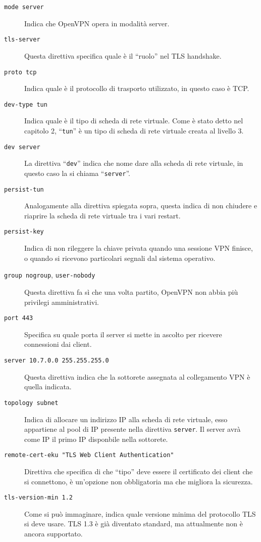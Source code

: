 \begin{description}
  \item[\texttt{mode server}]Indica che OpenVPN opera in modalità server.
  \item[\texttt{tls-server}]Questa direttiva specifica quale è il ``ruolo'' nel TLS
  handshake.
  \item[\texttt{proto tcp}]Indica quale è il protocollo di trasporto utilizzato,
  in questo caso è TCP.
  \item[\texttt{dev-type tun}]Indica quale è il tipo di scheda di rete virtuale.
  Come è stato detto nel capitolo 2, ``\texttt{tun}'' è un tipo di scheda di rete
  virtuale creata al livello 3.
  \item[\texttt{dev server}]La direttiva ``\texttt{dev}'' indica che nome dare
  alla scheda di rete virtuale, in questo caso la si chiama ``\texttt{server}''.
  \item[\texttt{persist-tun}]Analogamente alla direttiva spiegata sopra, questa
  indica di non chiudere e riaprire la scheda di rete virtuale tra i vari restart.
  \item[\texttt{persist-key}]Indica di non rileggere la chiave privata quando una
  sessione VPN finisce, o quando si ricevono particolari segnali dal sistema operativo.
  \item[\texttt{group nogroup}, \texttt{user-nobody}]Questa direttiva fa
  sì che una volta partito, OpenVPN
  non abbia più privilegi amministrativi.
  \item[\texttt{port 443}]Specifica su quale porta il server si mette in ascolto per
  ricevere connessioni dai client.
  \item[\texttt{server 10.7.0.0 255.255.255.0}]Questa direttiva indica che la sottorete
  assegnata al collegamento VPN è quella indicata.
  \item[\texttt{topology subnet}]Indica di allocare un indirizzo IP alla scheda
  di rete virtuale, esso appartiene al pool di IP presente nella direttiva \texttt{server}.
  Il server avrà come IP il primo IP disponbile nella sottorete.
  \item[\texttt{remote-cert-eku "TLS Web Client Authentication"}]Direttiva che specifica
  di che ``tipo'' deve essere il certificato dei client che si connettono, è un'opzione
  non obbligatoria ma che migliora la sicurezza.
  \item[\texttt{tls-version-min 1.2}]Come si può immaginare, indica quale versione minima
  del protocollo TLS si deve usare. TLS 1.3 è già diventato standard, ma attualmente
  non è ancora supportato.

\end{description}
